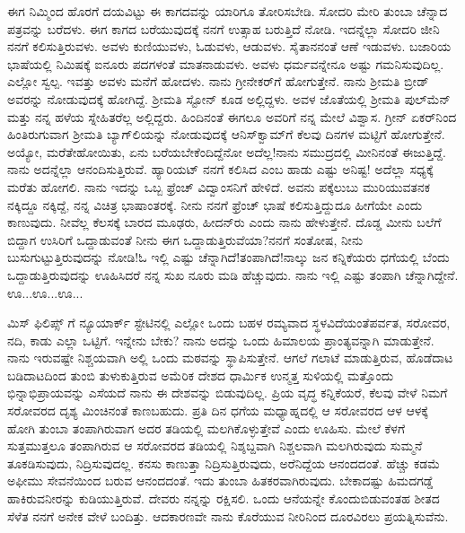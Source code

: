 ಈಗ ನಿಮ್ಮಿಂದ ಹೊರಗೆ ದಯವಿಟ್ಟು ಈ ಕಾಗದವನ್ನು ಯಾರಿಗೂ ತೋರಿಸಬೇಡಿ. ಸೋದರಿ ಮೇರಿ ತುಂಬಾ ಚೆನ್ನಾದ ಪತ್ರವನ್ನು ಬರೆದಳು. ಈಗ ಕಾಗದ ಬರೆಯು\break ವುದಕ್ಕೆ ನನಗೆ ಉತ್ಸಾಹ ಬರುತ್ತಿದೆ ನೋಡಿ. ಇದನ್ನೆಲ್ಲಾ ಸೋದರಿ ಜೀನಿ ನನಗೆ ಕಲಿಸು\break ತ್ತಿರುವಳು. ಅವಳು ಕುಣಿಯುವಳು, ಓಡುವಳು, ಆಡುವಳು. ಸೈತಾನನಂತೆ ಆಣೆ ಇಡುವಳು. ಬಜಾರಿಯ ಭಾಷೆಯಲ್ಲಿ ನಿಮಿಷಕ್ಕೆ ಐನೂರು ಪದಗಳಂತೆ ಮಾತನಾಡುವಳು. ಅವಳು ಧರ್ಮವನ್ನೇನೂ ಅಷ್ಟು ಗಮನಿಸುವುದಿಲ್ಲ. ಎಲ್ಲೋ ಸ್ವಲ್ಪ. ಇವತ್ತು ಅವಳು ಮನೆಗೆ ಹೋದಳು. ನಾನು ಗ್ರೀನೇಕರ್‌ಗೆ ಹೋಗುತ್ತೇನೆ. ನಾನು ಶ‍್ರೀಮತಿ ಬ್ರೀಡ್ ಅವರನ್ನು ನೋಡುವುದಕ್ಕೆ ಹೋಗಿದ್ದೆ. ಶ‍್ರೀಮತಿ ಸ್ಟೋನ್ ಕೂಡ ಅಲ್ಲಿದ್ದಳು. ಅವಳ ಜೊತೆಯಲ್ಲಿ ಶ‍್ರೀಮತಿ ಪುಲ್‌ಮೆನ್ ಮತ್ತು ನನ್ನ ಹಳೆಯ ಸ್ನೇಹಿತರೆಲ್ಲ ಅಲ್ಲಿದ್ದರು. ಹಿಂದಿನಂತೆ ಈಗಲೂ ಅವರಿಗೆ ನನ್ನ ಮೇಲೆ ವಿಶ್ವಾಸ. ಗ್ರೀನ್ ಏಕರ್‌ನಿಂದ ಹಿಂತಿರುಗುವಾಗ ಶ‍್ರೀಮತಿ ಬ್ಯಾಗ್‌ಲಿಯನ್ನು ನೋಡುವುದಕ್ಕೆ ಆನಿಸ್‌ಕ್ವಾಮ್‌ಗೆ ಕೆಲವು ದಿನಗಳ ಮಟ್ಟಿಗೆ ಹೋಗುತ್ತೇನೆ. ಅಯ್ಯೋ, ಮರೆತೇಹೋಯಿತು, ಏನು ಬರೆಯಬೇಕೆಂದಿದ್ದೆನೋ ಅದೆಲ್ಲ!ನಾನು ಸಮುದ್ರದಲ್ಲಿ ಮೀನಿನಂತೆ ಈಜುತ್ತಿದ್ದೆ. ನಾನು ಅದನ್ನೆಲ್ಲಾ ಆನಂದಿಸುತ್ತಿರುವೆ. ಹ್ಯಾರಿಯಟ್ ನನಗೆ ಕಲಿಸಿದ  ಎಂಬ ಹಾಡು ಎಷ್ಟು ಅನಿಷ್ಟ! ಅದೆಲ್ಲಾ ಸಧ್ಯಕ್ಕೆ ಮರೆತು ಹೋಗಲಿ. ನಾನು ಇದನ್ನು ಒಬ್ಬ ಫ್ರೆಂಚ್ ವಿದ್ವಾಂಸನಿಗೆ ಹೇಳಿದೆ. ಅವನು ಪಕ್ಕೆಲುಬು ಮುರಿಯುವತನಕ ನಕ್ಕಿದ್ದೂ ನಕ್ಕಿದ್ದೆ, ನನ್ನ ವಿಚಿತ್ರ ಭಾಷಾಂತರಕ್ಕೆ. ನೀನು ನನಗೆ ಫ್ರೆಂಚ್ ಭಾಷೆ ಕಲಿಸುತ್ತಿದ್ದುದೂ ಹೀಗೆಯೇ ಎಂದು ಕಾಣುವುದು. ನೀವೆಲ್ಲ ಕೆಲಸಕ್ಕೆ ಬಾರದ ಮೂಢರು, ಹೀದನ್‌ರು ಎಂದು ನಾನು ಹೇಳುತ್ತೇನೆ. ದೊಡ್ಡ ಮೀನು ಬಲೆಗೆ ಬಿದ್ದಾಗ ಉಸಿರಿಗೆ ಒದ್ದಾಡುವಂತೆ ನೀನು ಈಗ ಒದ್ದಾಡುತ್ತಿರುವೆಯಾ?ನನಗೆ ಸಂತೋಷ, ನೀನು ಬುಸುಗುಟ್ಟುತ್ತಿರುವುದನ್ನು ನೋಡಿ!ಓ ಇಲ್ಲಿ ಎಷ್ಟು ಚೆನ್ನಾಗಿದೆ!ತಂಪಾಗಿದೆ!ನಾಲ್ಕು ಜನ ಕನ್ನಿಕೆಯರು ಧಗೆಯಲ್ಲಿ ಬೆಂದು ಒದ್ದಾಡುತ್ತಿರುವುದನ್ನು ಊಹಿಸಿದರೆ ನನ್ನ ಸುಖ ನೂರು ಮಡಿ ಹೆಚ್ಚುವುದು. ನಾನು ಇಲ್ಲಿ ಎಷ್ಟು ತಂಪಾಗಿ ಚೆನ್ನಾಗಿದ್ದೇನೆ. ಊ...ಊ...ಊ...

ಮಿಸ್ ಫಿಲಿಪ್ಸ್ ಗೆ ನ್ಯೂಯಾರ್ಕ್ ಸ್ಟೇಟಿನಲ್ಲಿ ಎಲ್ಲೋ ಒಂದು ಬಹಳ ರಮ್ಯವಾದ ಸ್ಥಳವಿದೆಯಂತೆ\enginline{-}ಪರ್ವತ, ಸರೋವರ, ನದಿ, ಕಾಡು ಎಲ್ಲಾ ಒಟ್ಟಿಗೆ. ಇನ್ನೇನು ಬೇಕು? ನಾನು ಅದನ್ನು ಒಂದು ಹಿಮಾಲಯ ಪ್ರಾಂತ್ಯವನ್ನಾಗಿ ಮಾಡುತ್ತೇನೆ. ನಾನು ಇರುವಷ್ಟೇ ನಿಶ್ಚಯವಾಗಿ ಅಲ್ಲಿ ಒಂದು ಮಠವನ್ನು ಸ್ಥಾಪಿಸುತ್ತೇನೆ. ಆಗಲೆ ಗಲಾಟೆ ಮಾಡುತ್ತಿರುವ, ಹೊಡೆದಾಟ ಬಡಿದಾಟದಿಂದ ತುಂಬಿ ತುಳುಕುತ್ತಿರುವ ಅಮೆರಿಕ ದೇಶದ ಧಾರ್ಮಿಕ ಉನ್ಮತ್ತ ಸುಳಿಯಲ್ಲಿ ಮತ್ತೊಂದು ಭಿನ್ನಾಭಿಪ್ರಾಯವನ್ನು ಎಸೆಯದೆ ನಾನು ಈ ದೇಶವನ್ನು ಬಿಡುವುದಿಲ್ಲ. ಪ್ರಿಯ ವೃದ್ಧ ಕನ್ನಿಕೆಯರೆ, ಕೆಲವು ವೇಳೆ ನಿಮಗೆ ಸರೋವರದ ದೃಶ್ಯ ಮಿಂಚಿನಂತೆ ಕಾಣಬಹುದು. ಪ್ರತಿ ದಿನ ಧಗೆಯ ಮಧ್ಯಾಹ್ನದಲ್ಲಿ ಆ ಸರೋವರದ ಆಳ ಆಳಕ್ಕೆ ಹೋಗಿ ತುಂಬಾ ತಂಪಾಗಿರುವಾಗ ಅದರ ತಡಿಯಲ್ಲಿ ಮಲಗಿಕೊಳ್ಳುತ್ತೇವೆ ಎಂದು ಊಹಿಸು. ಮೇಲೆ ಕೆಳಗೆ ಸುತ್ತಮುತ್ತಲೂ ತಂಪಾಗಿರುವ ಆ ಸರೋವರದ ತಡಿಯಲ್ಲಿ ನಿಶ್ಶಬ್ದವಾಗಿ ನಿಶ್ಚಲವಾಗಿ ಮಲಗಿರುವುದು\enginline{-} ಸುಮ್ಮನೆ ತೂಕಡಿಸುವುದು, ನಿದ್ರಿಸುವುದಲ್ಲ. ಕನಸು ಕಾಣುತ್ತಾ ನಿದ್ರಿಸು\-ತ್ತಿರುವುದು, ಅರೆನಿದ್ದೆಯ ಆನಂದದಂತೆ. ಹೆಚ್ಚು ಕಡಮೆ ಅಫೀಮು ಸೇವನೆಯಿಂದ ಬರುವ ಆನಂದದಂತೆ. ಇದು ತುಂಬಾ ಹಿತಕರವಾಗಿರುವುದು. ಬೇಕಾದಷ್ಟು ಹಿಮದಗಡ್ಡೆ ಹಾಕಿರುವನೀರನ್ನು ಕುಡಿಯುತ್ತಿರುವೆ. ದೇವರು ನನ್ನನ್ನು ರಕ್ಷಿಸಲಿ. ಒಂದು ಆನೆಯನ್ನೇ ಕೊಂದುಬಿಡುವಂತಹ ಶೀತದ ಸೆಳೆತ ನನಗೆ ಅನೇಕ ವೇಳೆ ಬಂದಿತ್ತು. ಆದಕಾರಣವೇ ನಾನು ಕೊರೆಯುವ ನೀರಿನಿಂದ ದೂರವಿರಲು ಪ್ರಯತ್ನಿಸುವೆನು.

